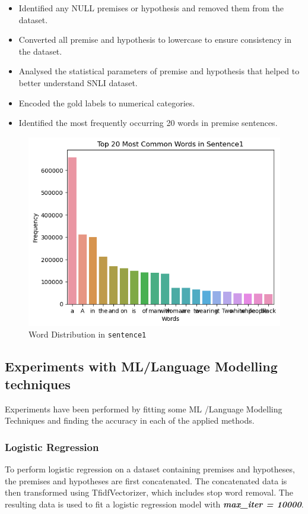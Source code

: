 \begin{itemize}
	\item Identified any NULL premises or hypothesis and removed them from the dataset.
	\item Converted all premise and hypothesis to lowercase to ensure consistency in the dataset.
	\item Analysed the statistical parameters of premise and hypothesis that helped to better understand SNLI dataset.
	\item Encoded the gold labels to numerical categories.
	\item Identified the most frequently occurring 20 words in premise sentences.
\end{itemize}

\begin{figure}[h]
	\centering
	\includegraphics[scale=0.9]{img/word_dist.png}
	\caption{Word Distribution in \texttt{sentence1}}
\end{figure}


\subsection{Experiments with ML/Language Modelling techniques}

Experiments have been performed by fitting some ML /Language Modelling Techniques and finding the accuracy in each of the applied methods.

\subsubsection{Logistic Regression}
To perform logistic regression on a dataset containing premises and hypotheses, the premises and hypotheses are first concatenated. The concatenated data is then transformed using TfidfVectorizer, which includes stop word removal. The resulting data is used to fit a logistic regression model with \textit{\textbf{max\_iter = 10000}}.

